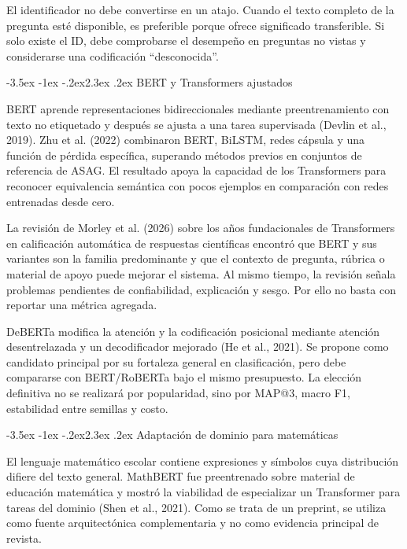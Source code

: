 \documentclass[11pt,oneside,openany]{book}
\makeatletter
\renewcommand\section{\@startsection{section}{1}{\z@}%
  {-3.5ex \@plus -1ex \@minus -.2ex}{2.3ex \@plus .2ex}%
  {\normalfont\Large\sffamily\bfseries\color{AzulMedio}}}
\makeatother
\begin{document}
El identificador no debe convertirse en un atajo. Cuando el texto completo de la
pregunta esté disponible, es preferible porque ofrece significado transferible.
Si solo existe el ID, debe comprobarse el desempeño en preguntas no vistas y
considerarse una codificación ``desconocida''.

\section{BERT y Transformers ajustados}

BERT aprende representaciones bidireccionales mediante preentrenamiento con texto
no etiquetado y después se ajusta a una tarea supervisada (Devlin et al., 2019).
Zhu et al. (2022) combinaron BERT, BiLSTM, redes cápsula y una función de pérdida
específica, superando métodos previos en conjuntos de referencia de ASAG. El
resultado apoya la capacidad de los Transformers para reconocer equivalencia
semántica con pocos ejemplos en comparación con redes entrenadas desde cero.

La revisión de Morley et al. (2026) sobre los años fundacionales de Transformers
en calificación automática de respuestas científicas encontró que BERT y sus
variantes son la familia predominante y que el contexto de pregunta, rúbrica o
material de apoyo puede mejorar el sistema. Al mismo tiempo, la revisión señala
problemas pendientes de confiabilidad, explicación y sesgo. Por ello no basta con
reportar una métrica agregada.

DeBERTa modifica la atención y la codificación posicional mediante atención
desentrelazada y un decodificador mejorado (He et al., 2021). Se propone como
candidato principal por su fortaleza general en clasificación, pero debe
compararse con BERT/RoBERTa bajo el mismo presupuesto. La elección definitiva no
se realizará por popularidad, sino por MAP@3, macro F1, estabilidad entre semillas
y costo.

\section{Adaptación de dominio para matemáticas}

El lenguaje matemático escolar contiene expresiones y símbolos cuya distribución
difiere del texto general. MathBERT fue preentrenado sobre material de educación
matemática y mostró la viabilidad de especializar un Transformer para tareas del
dominio (Shen et al., 2021). Como se trata de un preprint, se utiliza como fuente
arquitectónica complementaria y no como evidencia principal de revista.
\end{document}

